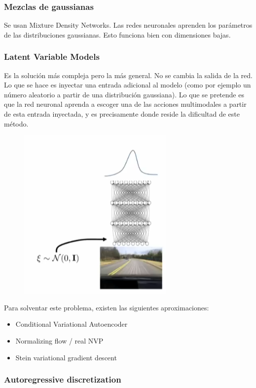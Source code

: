 \subsubsection{Mezclas de gaussianas}%
\label{ssub:mezclas_de_gaussianas}

Se usan Mixture Density Networks. Las redes neuronales aprenden los parámetros de las
distribuciones gaussianas. Esto funciona bien con dimensiones bajas. 

\subsubsection{Latent Variable Models}%
\label{ssub:latent_variable_models}

Es la solución más compleja pero la más general. No se cambia la salida de la red. Lo que se
hace es inyectar una entrada adicional al modelo (como por ejemplo un número aleatorio a partir
de una distribución gaussiana). Lo que se pretende es que la red neuronal aprenda a escoger
una de las acciones multimodales a partir de esta entrada inyectada, y es precisamente donde
reside la dificultad de este método.

\begin{figure}[htpb]
	\centering
	\includegraphics[width=0.4\linewidth]{figures/2020-06-11-140924_289x320_scrot.png}
\end{figure}

Para solventar este problema, existen las siguientes aproximaciones:
\begin{itemize}
    \item Conditional Variational Autoencoder
    \item Normalizing flow / real NVP
    \item Stein variational gradient descent
\end{itemize}

\subsubsection{Autoregressive discretization}%
\label{ssub:autoregressive_discretization}

